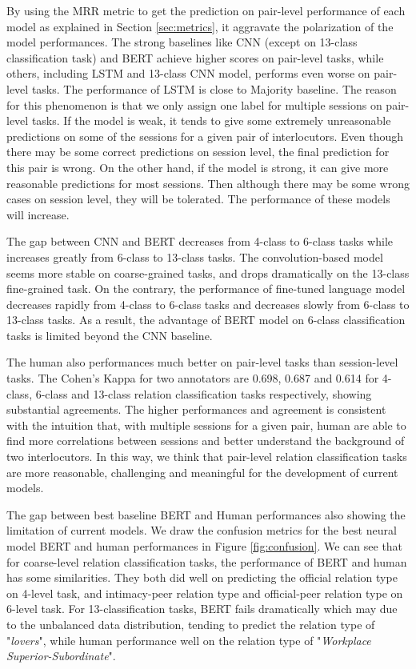 By using the MRR metric to get the prediction on pair-level performance of each model as explained in Section \ref{sec:metrics}, it aggravate the polarization of the model performances. The strong baselines like CNN (except on 13-class classification task) and BERT achieve higher scores on pair-level tasks, while others, including LSTM and 13-class CNN model, performs even worse on pair-level tasks. The performance of LSTM is close to Majority baseline. The reason for this phenomenon is that we only assign one label for multiple sessions on pair-level tasks. If the model is weak, it tends to give some extremely unreasonable predictions on some of the sessions for a given pair of interlocutors. Even though there may be some correct predictions on session level, the final prediction for this pair is wrong. On the other hand, if the model is strong, it can give more reasonable predictions for most sessions. Then although there may be some wrong cases on session level, they will be tolerated. The performance of these models will increase.

The gap between CNN and BERT decreases from 4-class to 6-class tasks while increases greatly from 6-class to 13-class tasks. The convolution-based model seems more stable on coarse-grained tasks, and drops dramatically on the 13-class fine-grained task. On the contrary, the performance of fine-tuned language model decreases rapidly from 4-class to 6-class tasks and decreases slowly from 6-class to 13-class tasks. As a result, the advantage of BERT model on 6-class classification tasks is limited beyond the CNN baseline.

The human also performances much better on pair-level tasks than session-level tasks. The Cohen's Kappa for two annotators are 0.698, 0.687 and 0.614 for 4-class, 6-class and 13-class relation classification tasks respectively, showing substantial agreements. The higher performances and agreement is consistent with the intuition that, with multiple sessions for a given pair, human are able to find more correlations between sessions and better understand the background of two interlocutors. In this way, we think that pair-level relation classification tasks are more reasonable, challenging and meaningful for the development of current models. 

The gap between best baseline BERT and Human performances also showing the limitation of current models. We draw the confusion metrics for the best neural model BERT and human performances in Figure \ref{fig:confusion}. We can see that for coarse-level relation classification tasks, the performance of BERT and human has some similarities. They both did well on predicting the official relation type on 4-level task, and intimacy-peer relation type and official-peer relation type on 6-level task. For 13-classification tasks, BERT fails dramatically which may due to the unbalanced data distribution, tending to predict the relation type of "{\em lovers}", while human performance well on the relation type of "{\em Workplace Superior-Subordinate}".




